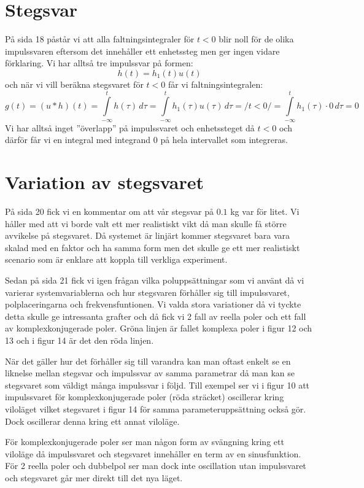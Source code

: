 \documentclass[usenames,dvipsnames]{article}
\begin{document}
\section{Stegsvar}
På sida 18 påstår vi att alla faltningsintegraler för $t<0$ blir noll för de olika impulssvaren eftersom det innehåller ett enhetssteg men ger ingen vidare förklaring. 
Vi har alltså tre impulssvar på formen:
$$h(t)=h_1(t)u(t)$$
och när vi vill beräkna stegsvaret för $t<0$ får vi faltningsintegralen:
$$g(t)=(u*h)(t)=\int\limits_{-\infty}^{t}h(\tau)\,d\tau=\int\limits_{-\infty}^{t}h_1(\tau)u(\tau)\,d\tau= \bigg/ t < 0 \bigg/=\int\limits_{-\infty}^{t}h_1(\tau)\cdot 0\,d\tau=0$$
Vi har alltså inget ''överlapp'' på impulssvaret och enhetssteget då $t<0$ och därför får vi en integral med integrand $0$ på hela intervallet som integreras.

\section{Variation av stegsvaret}
På sida 20 fick vi en kommentar om att vår stegsvar på $0.1$ kg var för litet. Vi håller med att vi borde valt ett mer realistiskt vikt då man skulle få större avvikelse på stegsvaret. Då systemet är linjärt kommer stegsvaret bara vara skalad med en faktor och ha samma form men det skulle ge ett mer realistiskt scenario som är enklare att koppla till verkliga experiment.

Sedan på sida 21 fick vi igen frågan vilka poluppsättningar som vi använt då vi varierar systemvariablerna och hur stegsvaren förhåller sig till impulssvaret, polplaceringarna och frekvensfuntionen. Vi valda stora variationer då vi tyckte detta skulle ge intressanta grafter och då fick vi 2 fall av reella poler och ett fall av komplexkonjugerade poler. Gröna linjen är fallet komplexa poler i figur 12 och 13 och i figur 14 är det den röda linjen.

När det gäller hur det förhåller sig till varandra kan man oftast enkelt se en liknelse mellan stegsvar och impulssvar av samma parametrar då man kan se stegsvaret som väldigt många impulssvar i följd. Till exempel ser vi i figur 10 att impulssvaret för komplexkonjugerade poler (röda sträcket) oscillerar kring viloläget vilket stegsvaret i figur 14 för samma parameteruppsättning också gör. Dock oscillerar denna kring ett annat viloläge.

För komplexkonjugerade poler ser man någon form av svängning kring ett viloläge då impulssvaret och stegsvaret innehåller en term av en sinusfunktion. För 2 reella poler och dubbelpol ser man dock inte oscillation utan impulssvaret och stegsvaret går mer direkt till det nya läget.
\end{document}
